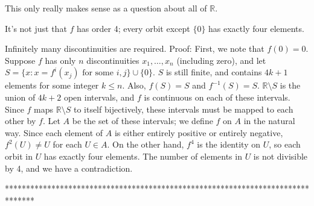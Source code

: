 \begin{mysolution}
	This only really makes sense as a question about all of $\mathbb{R}$.

It's not just that $f$ has order 4; every orbit except $\{0\}$ has exactly four elements.

Infinitely many discontinuities are required.
Proof:
First, we note that $f(0)=0$. Suppose $f$ has only $n$ discontinuities $x_{1},\dots,x_{n}$ (including zero), and let $S=\{x: x=f^{i}(x_{j})\text{ for some }i,j\}\cup \{0\}$. $S$ is still finite, and contains $4k+1$ elements for some integer $k\le n$. Also, $f(S)=S$ and $f^{-1}(S)=S$.
$\mathbb{R}\setminus S$ is the union of $4k+2$ open intervals, and $f$ is continuous on each of these intervals. Since $f$ maps $\mathbb{R}\setminus S$ to itself bijectively, these intervals must be mapped to each other by $f$. Let $A$ be the set of these intervals; we define $f$ on $A$ in the natural way. Since each element of $A$ is either entirely positive or entirely negative, $f^{2}(U)\neq U$ for each $U\in A$. On the other hand, $f^{4}$ is the identity on $U$, so each orbit in $U$ has exactly four elements. The number of elements in $U$ is not divisible by 4, and we have a contradiction.
\end{mysolution}
*******************************************************************************
